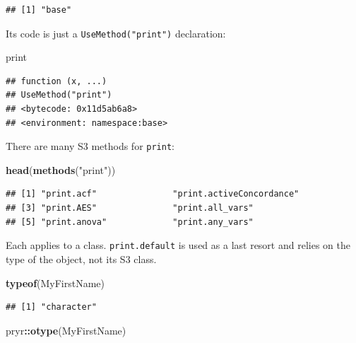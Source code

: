 \documentclass[
  12pt,
  american,
  a4paper,
  extrafontsizes,onecolumn,openright
  ]{memoir}
\newenvironment{Shaded}{\begin{snugshade}}{\end{snugshade}}
\newcommand{\FunctionTok}[1]{\textcolor[rgb]{0.13,0.29,0.53}{\textbf{#1}}}
\newcommand{\NormalTok}[1]{#1}
\newcommand{\SpecialCharTok}[1]{\textcolor[rgb]{0.81,0.36,0.00}{\textbf{#1}}}
\newcommand{\StringTok}[1]{\textcolor[rgb]{0.31,0.60,0.02}{#1}}
\begin{document}
\begin{verbatim}
## [1] "base"
\end{verbatim}

\normalsize

Its code is just a \texttt{UseMethod("print")} declaration:

\scriptsize

\begin{Shaded}
\begin{Highlighting}[]
\NormalTok{print}
\end{Highlighting}
\end{Shaded}

\begin{verbatim}
## function (x, ...) 
## UseMethod("print")
## <bytecode: 0x11d5ab6a8>
## <environment: namespace:base>
\end{verbatim}

\normalsize

There are many S3 methods for \texttt{print}:

\scriptsize

\begin{Shaded}
\begin{Highlighting}[]
\FunctionTok{head}\NormalTok{(}\FunctionTok{methods}\NormalTok{(}\StringTok{"print"}\NormalTok{))}
\end{Highlighting}
\end{Shaded}

\begin{verbatim}
## [1] "print.acf"               "print.activeConcordance"
## [3] "print.AES"               "print.all_vars"         
## [5] "print.anova"             "print.any_vars"
\end{verbatim}

\normalsize

Each applies to a class. \texttt{print.default} is used as a last resort and relies on the type of the object, not its S3 class.

\scriptsize

\begin{Shaded}
\begin{Highlighting}[]
\FunctionTok{typeof}\NormalTok{(MyFirstName)}
\end{Highlighting}
\end{Shaded}

\begin{verbatim}
## [1] "character"
\end{verbatim}

\begin{Shaded}
\begin{Highlighting}[]
\NormalTok{pryr}\SpecialCharTok{::}\FunctionTok{otype}\NormalTok{(MyFirstName)}
\end{Highlighting}
\end{Shaded}
\end{document}

